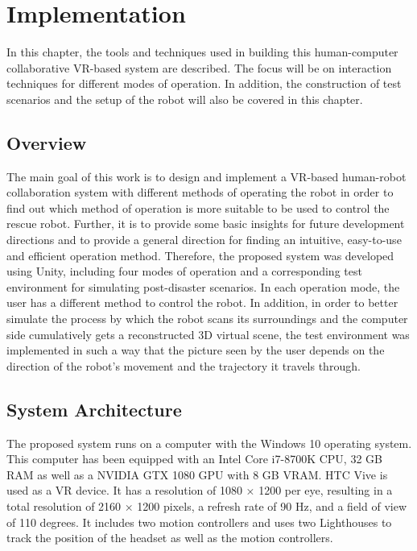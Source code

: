\chapter{Implementation}
\label{implementation}

In this chapter, the tools and techniques used in building this human-computer collaborative VR-based system are described. The focus will be on interaction techniques for different modes of operation. In addition, the construction of test scenarios and the setup of the robot will also be covered in this chapter.


\section{Overview}
The main goal of this work is to design and implement a VR-based human-robot collaboration system with different methods of operating the robot in order to find out which method of operation is more suitable to be used to control the rescue robot. Further, it is to provide some basic insights for future development directions and to provide a general direction for finding an intuitive, easy-to-use and efficient operation method. Therefore, the proposed system was developed using Unity, including four modes of operation and a corresponding test environment for simulating post-disaster scenarios. In each operation mode, the user has a different method to control the robot. In addition, in order to better simulate the process by which the robot scans its surroundings and the computer side cumulatively gets a reconstructed 3D virtual scene, the test environment was implemented in such a way that the picture seen by the user depends on the direction of the robot's movement and the trajectory it travels through.


\section{System Architecture}
The proposed system runs on a computer with the Windows 10 operating system. This computer has been equipped with an Intel Core i7-8700K CPU, 32 GB RAM as well as a NVIDIA GTX 1080 GPU with 8 GB VRAM. HTC Vive is used as a VR device. It has a resolution of 1080 × 1200 per eye, resulting in a total resolution of 2160 × 1200 pixels, a refresh rate of 90 Hz, and a field of view of 110 degrees. It includes two motion controllers and uses two Lighthouses to track the position of the headset as well as the motion controllers.

